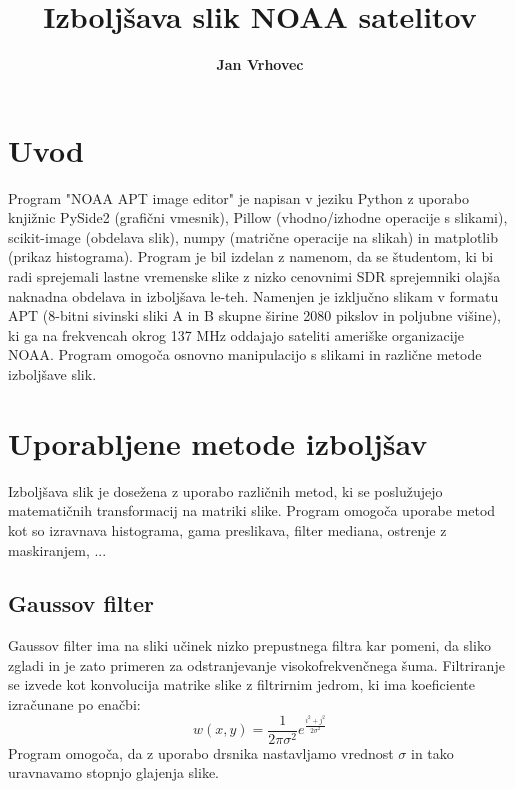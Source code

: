 \documentclass[a4paper, twocolumn]{article}
\begin{document}

	\title{	\textbf{Izboljšava slik NOAA satelitov}}
	
	\author[1]{\textbf{Jan Vrhovec}}
	\date{}
	\maketitle
	

\section{Uvod}

Program "NOAA APT image editor" je napisan v jeziku Python z uporabo knjižnic PySide2 (grafični vmesnik), Pillow (vhodno/izhodne operacije s slikami), scikit-image (obdelava slik), numpy (matrične operacije na slikah) in matplotlib (prikaz histograma). Program je bil izdelan z namenom, da se študentom, ki bi radi sprejemali lastne vremenske slike z nizko cenovnimi SDR sprejemniki olajša naknadna obdelava in izboljšava le-teh. Namenjen je izključno slikam v formatu APT (8-bitni sivinski sliki A in B skupne širine 2080 pikslov in poljubne višine), ki ga na frekvencah okrog 137 MHz oddajajo sateliti ameriške organizacije NOAA. Program omogoča osnovno manipulacijo s slikami in različne metode izboljšave slik.


\section{Uporabljene metode izboljšav}
Izboljšava slik je dosežena z uporabo različnih metod, ki se poslužujejo matematičnih transformacij na matriki slike. Program omogoča uporabe metod kot so izravnava histograma, gama preslikava, filter mediana, ostrenje z maskiranjem, ...

\subsection{Gaussov filter}
Gaussov filter ima na sliki učinek nizko prepustnega filtra kar pomeni, da sliko zgladi in je zato primeren za odstranjevanje visokofrekvenčnega šuma. Filtriranje se izvede kot konvolucija matrike slike z filtrirnim jedrom, ki ima koeficiente izračunane po enačbi:
\begin{equation}
w(x,y)=\frac{1}{2 \pi {\sigma}^2} e^{\frac{i^2 + j^2}{2 \sigma^2}}
\end{equation}
Program omogoča, da z uporabo drsnika nastavljamo vrednost $\sigma$ in tako uravnavamo stopnjo glajenja slike.
\end{document}
